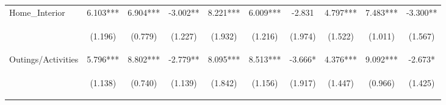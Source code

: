 \begin{tabular}{lccccccccc}
\noalign{\smallskip}Home_Interior & 6.103*** & 6.904*** & -3.002** & 8.221*** & 6.009*** & -2.831 & 4.797*** & 7.483*** & -3.300**\\
 & \begin{footnotesize}(1.196)\end{footnotesize} & \begin{footnotesize}(0.779)\end{footnotesize} & \begin{footnotesize}(1.227)\end{footnotesize} & \begin{footnotesize}(1.932)\end{footnotesize} & \begin{footnotesize}(1.216)\end{footnotesize} & \begin{footnotesize}(1.974)\end{footnotesize} & \begin{footnotesize}(1.522)\end{footnotesize} & \begin{footnotesize}(1.011)\end{footnotesize} & \begin{footnotesize}(1.567)\end{footnotesize}\\
\noalign{\smallskip}Outings/Activities & 5.796*** & 8.802*** & -2.779** & 8.095*** & 8.513*** & -3.666* & 4.376*** & 9.092*** & -2.673*\\
 & \begin{footnotesize}(1.138)\end{footnotesize} & \begin{footnotesize}(0.740)\end{footnotesize} & \begin{footnotesize}(1.139)\end{footnotesize} & \begin{footnotesize}(1.842)\end{footnotesize} & \begin{footnotesize}(1.156)\end{footnotesize} & \begin{footnotesize}(1.917)\end{footnotesize} & \begin{footnotesize}(1.447)\end{footnotesize} & \begin{footnotesize}(0.966)\end{footnotesize} & \begin{footnotesize}(1.425)\end{footnotesize}\\

\end{tabular}
